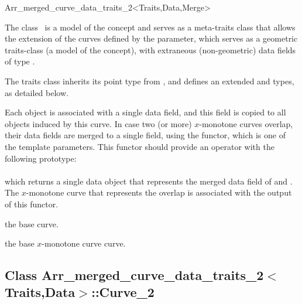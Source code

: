 
\ccRefPageBegin
\begin{ccRefClass}{Arr_merged_curve_data_traits_2<Traits,Data,Merge>}

\ccDefinition

The class \ccRefName\ is a model of the  concept
and serves as a meta-traits class that allows the extension of the curves
defined by the  parameter, which serves as a geometric
traits-class (a model of the  concept), with
extraneous (non-geometric) data fields of type .

The traits class inherits its point type from ,
and defines an extended  and  types,
as detailed below.

Each  object is associated with a single data field, and this
field is copied to all  objects induced by this curve.
In case two (or more) $x$-monotone curves overlap, their data fields are
merged to a single field, using the  functor, which is one of
the template parameters. This functor should provide an operator with the
following prototype: \\
\indent {} \\
which returns a single data object that represents the merged data field
of  and . The $x$-monotone curve that represents the overlap
is associated with the output of this functor.

 
\ccIsModel

\ccInheritsFrom

\ccTypes

    {the base curve.}

    {the base $x$-monotone curve curve.}

\subsection*{Class 
 Arr\_merged\_curve\_data\_traits\_2$<$Traits,Data$>$::Curve\_2}


\end{ccRefClass}
